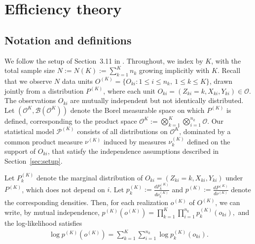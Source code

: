 \documentclass[11pt]{article}
\theoremstyle{plain}
\theoremstyle{definition}
\theoremstyle{remark}
\theoremstyle{definition}
\begin{document}
 


\section{Efficiency theory}


\subsection{Notation and definitions}

We follow the setup of Section~3.11 in \citet{vanderVaartWellner}. Throughout, we index by \( K \), with the total sample size \( N := N(K) := \sum_{k=1}^{K} n_k \) growing implicitly with \( K \). Recall that we observe \( N \) data units \( O^{(K)} = \{O_{ki} : 1 \leq i \leq n_k,\ 1 \leq k \leq K\} \), drawn jointly from a distribution \( P^{(K)} \), where each unit \( O_{ki} = (Z_{ki} = k, X_{ki}, Y_{ki}) \in \mathcal{O} \). The observations \( O_{ki} \) are mutually independent but not identically distributed. Let \( (\mathcal{O}^K, \mathcal{B}(\mathcal{O}^K)) \) denote the Borel measurable space on which \( P^{(K)} \) is defined, corresponding to the product space \( \mathcal{O}^K := \bigotimes_{k=1}^{K} \bigotimes_{i=1}^{n_k} \mathcal{O} \). Our statistical model \( \mathcal{P}^{(K)} \) consists of all distributions on \( \mathcal{O}^K \), dominated by a common product measure \( \nu^{(K)} \) induced by measures \( \nu_k^{(K)} \) defined on the support of $O_{ki}$, that satisfy the independence assumptions described in Section~\ref{sec:setup}.

Let \( P_k^{(K)} \) denote the marginal distribution of \( O_{ki} = (Z_{ki} = k, X_{ki}, Y_{ki}) \) under \( P^{(K)} \), which does not depend on \( i \). Let \( p_k^{(K)} := \frac{dP_k^{(K)}}{d\nu_k^{(K)}} \) and \( p^{(K)} := \frac{dP^{(K)}}{d\nu^{(K)}} \) denote the corresponding densities. Then, for each realization \( o^{(K)} \) of \( O^{(K)} \), we can write, by mutual independence, $p^{(K)}(o^{(K)}) = \prod_{k=1}^{K} \prod_{i=1}^{n_k} p_k^{(K)}(o_{ki}),$
and the log-likelihood satisfies
\begin{align}
    \log p^{(K)}(o^{(K)}) = \sum_{k=1}^K \sum_{i=1}^{n_k} \log p_k^{(K)}(o_{ki}). \label{eqn::loglik}
\end{align}
\end{document}
